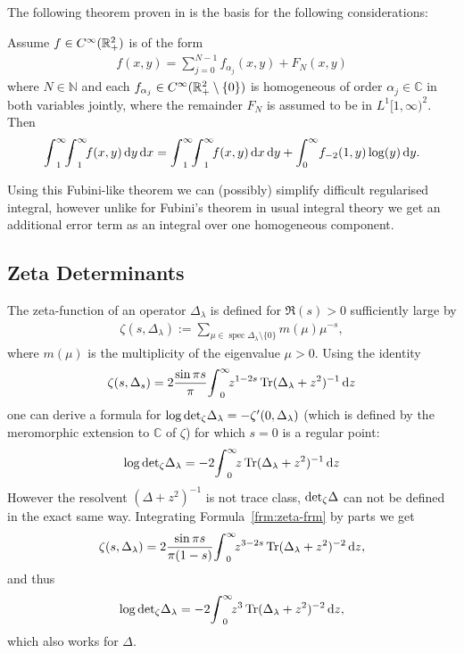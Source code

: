 The following theorem proven in \cite{LV12} is the basis for the following
considerations:
\begin{Theorem}
  \label{thm:fubini}
  Assume $f\in\Cinf(\Rplus[2])$ is of the form
  \begin{align*}
    f(x,y) = \sum_{j=0}^{N-1} f_{\alpha_j}(x,y) + F_N(x,y)
  \end{align*}
  where $N\in\mathbb{N}$ and each $f_{\alpha_j}\in\Cinf(\mathbb{R}_+^2\setminus\{0\})$
  is homogeneous of order $\alpha_j\in\mathbb{C}$ in both variables jointly,
  where the remainder $F_N$ is assumed to be in $L^1[1,\infty)^2$. Then
  \begin{align}
    \Regint{x}{\Regint{y}{f(x,y)}} =
    \Regint{y}{\Regint{x}{f(x,y)}} + \Integ[\infty]{0}{y}{f_{-2}(1,y)\log(y)}.
  \end{align}
\end{Theorem}
Using this Fubini-like theorem we can (possibly) simplify difficult regularised
integral, however unlike for Fubini's theorem in usual integral theory we get an
additional error term as an integral over one homogeneous component. 

\subsection{Zeta Determinants}
The zeta-function of an operator $\Delta_\lambda$ is defined for $\Re(s) > 0$
sufficiently large by
\begin{align}
  \zeta(s,\Delta_\lambda) :=
  \sum_{\mu\in\operatorname{spec}\Delta_\lambda\setminus\{0\}} m(\mu)\mu^{-s},
\end{align}
where $m(\mu)$ is the multiplicity of the eigenvalue $\mu > 0$. Using the
identity
\begin{align}
  \label{frm:zeta-frm}
  \zeta(s,\Delta_s) = 2 \frac{\sin\pi
  s}{\pi}\Regint[0]{z}{z^{1-2s}\Tr(\Delta_\lambda + z^2)^{-1}}
\end{align}
one can derive a formula for $\log\zdet\Delta_\lambda =
-\zeta'(0,\Delta_\lambda)$ (which is defined by the meromorphic extension to
$\mathbb{C}$ of $\zeta$) for which $s=0$ is a regular point:
\begin{align}
  \log\zdet\Delta_\lambda = -2\Regint[0]{z}{z\Tr(\Delta_\lambda + z^2)^{-1}}
\end{align}
However the resolvent $(\Delta + z^2)^{-1}$ is not trace class, $\zdet\Delta$
can not be defined in the exact same way. Integrating
Formula~\eqref{frm:zeta-frm} by parts we get
\begin{align}
  \zeta(s,\Delta_\lambda) = 2\frac{\sin\pi
  s}{\pi(1-s)}\Regint[0]{z}{z^{3-2s}\Tr(\Delta_\lambda + z^2)^{-2}},
\end{align}
and thus
\begin{align}
  \log\zdet\Delta_\lambda = -2 \Regint[0]{z}{z^3\Tr(\Delta_\lambda + z^2)^{-2}},
\end{align}
which also works for $\Delta$.

